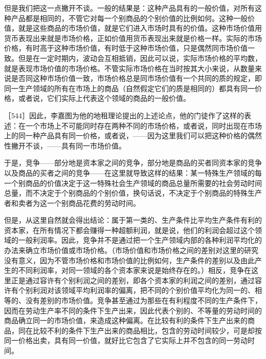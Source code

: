 但是我们把这一点撇开不谈。一般的结果是：这种产品具有的一般价值，对所有这种产品都是相同的，不管它对每一个别商品的个别价值的比例如何。这种一般价值，就是这些商品的市场价值，就是它们进入市场时具有的价值。这种市场价值用货币表现出来就是市场价格，正如价值用货币表现出来就是价格一样。实际的市场价格，有时高于这种市场价值，有时低于这种市场价值，只是偶然同市场价值一致。但是在一定时期内，波动会互相抵销，因此可以说，实际市场价格的平均数，就是表现市场价值的市场价格。不管实际市场价格在当时按其大小来说，从数量来说是否同这种市场价值一致，市场价格总是同市场价值有一个共同的质的规定，即同一生产领域的所有在市场上的商品（自然假定它们的质是相同的）都具有同一价格，或者说，它们实际上代表这个领域的商品的一般价值。

［544］因此，李嘉图为他的地租理论提出的上述论点，他的门徒作了这样的表述：在一个市场上不可能同时存在两种不同的市场价格，或者说，同时出现在市场上的同一种产品具有同一价格，或者说，——因为这里我们可以把这种价格的偶然性撇开不谈，——具有同一市场价值。

于是，竞争——部分地是资本家之间的竞争，部分地是商品的买者同资本家的竞争以及商品的买者之间的竞争——在这里就导致这样的结果：某一特殊生产领域的每一个别商品的价值决定于这一特殊社会生产领域的商品总量所需要的社会劳动时间总量，而不决定于个别商品的个别价值，换句话说，不决定于个别商品的特殊生产者和卖者为这一个别商品花费的劳动时间。

但是，从这里自然就会得出结论：属于第一类的、生产条件比平均生产条件有利的资本家，在所有情况下都会赚得一种超额利润，就是说，他们的利润会超过这个领域的一般利润率。因此，竞争并不是通过把一个生产领域内部的各种利润平均化的办法来确立市场价值或市场价格。（市场价值和市场价格之间的差别对这里的研究没有意义，因为不管市场价格和市场价值的比例如何，生产条件的差别以及由此产生的不同利润率，对同一领域的各个资本家来说是始终存在的。）相反，竞争在这里正是通过容许有个别利润之间的差别，即各个资本家的利润之间的差别，通过容许有个别利润对该领域平均利润率的偏离，把不同的个别价值平均化为同一的、相等的、没有差别的市场价值。竞争甚至通过为那些在有利程度不同的生产条件下，因而在劳动生产率不同的条件下生产出来，因此代表个别的、不等量的劳动时间的商品确立同一的市场价值，来造成这种偏离。在比较有利的条件下生产出来的商品，同在比较不利的条件下生产出来的商品相比，包含的劳动时间较少，可是却按同一价格出卖，具有同一价值，就好比它包含了它实际上并不包含的同一劳动时间。


